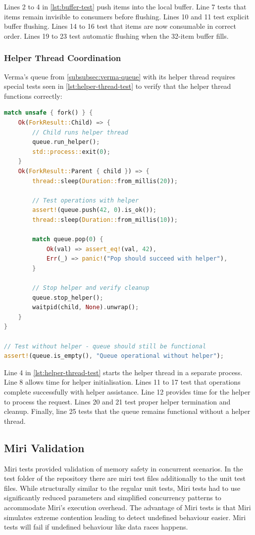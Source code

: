 Lines 2 to 4 in \cref{lst:buffer-test} push items into the local buffer. Line 7 tests that items remain invisible to consumers before flushing. Lines 10 and 11 test explicit buffer flushing. Lines 14 to 16 test that items are now consumable in correct order. Lines 19 to 23 test automatic flushing when the 32-item buffer fills.

\subsubsection{Helper Thread Coordination}
Verma's queue from \cref{subsubsec:verma-queue} with its helper thread requires special tests seen in \cref{lst:helper-thread-test} to verify that the helper thread functions correctly:

\begin{lstlisting}[language=Rust, style=boxed, caption={Helper thread coordination test}, label={lst:helper-thread-test}]
match unsafe { fork() } {
    Ok(ForkResult::Child) => {
        // Child runs helper thread
        queue.run_helper();
        std::process::exit(0);
    }
    Ok(ForkResult::Parent { child }) => {
        thread::sleep(Duration::from_millis(20));
        
        // Test operations with helper
        assert!(queue.push(42, 0).is_ok());
        thread::sleep(Duration::from_millis(10));
        
        match queue.pop(0) {
            Ok(val) => assert_eq!(val, 42),
            Err(_) => panic!("Pop should succeed with helper"),
        }
        
        // Stop helper and verify cleanup
        queue.stop_helper();
        waitpid(child, None).unwrap();
    }
}

// Test without helper - queue should still be functional
assert!(queue.is_empty(), "Queue operational without helper");
\end{lstlisting}

Line 4 in \cref{lst:helper-thread-test} starts the helper thread in a separate process. Line 8 allows time for helper initialisation. Lines 11 to 17 test that operations complete successfully with helper assistance. Line 12 provides time for the helper to process the request. Lines 20 and 21 test proper helper termination and cleanup. Finally, line 25 tests that the queue remains functional without a helper thread.

\subsection{Miri Validation}
Miri tests provided validation of memory safety in concurrent scenarios. In the test folder of the repository there are miri test files additionally to the unit test files. While structurally similar to the regular unit tests, Miri tests had to use significantly reduced parameters and simplified concurrency patterns to accommodate Miri's execution overhead. The advantage of Miri tests is that Miri simulates extreme contention leading to detect undefined behaviour easier. Miri tests will fail if undefined behaviour like data races happens.

